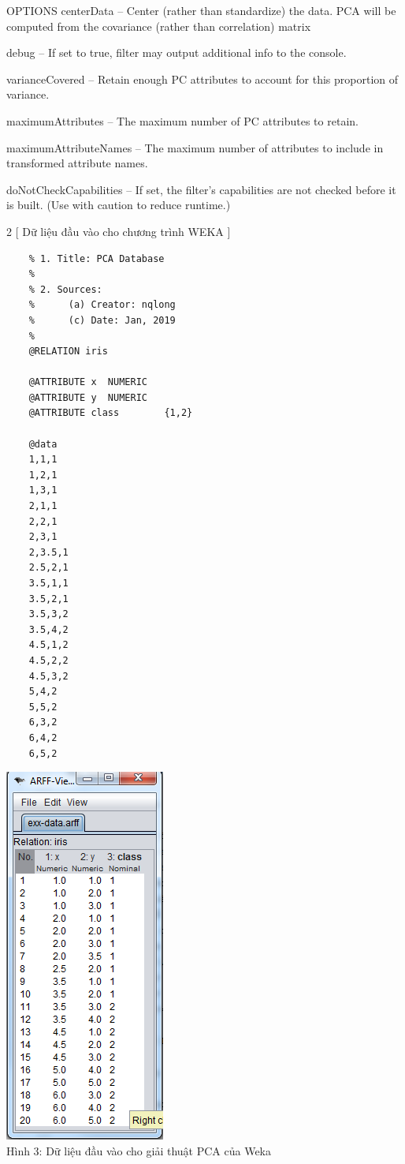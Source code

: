 \documentclass{hcmutarticle}
\begin{document}
OPTIONS
centerData -- Center (rather than standardize) the data. PCA will be computed from the covariance (rather than correlation) matrix

debug -- If set to true, filter may output additional info to the console.

varianceCovered -- Retain enough PC attributes to account for this proportion of variance.

maximumAttributes -- The maximum number of PC attributes to retain.

maximumAttributeNames -- The maximum number of attributes to include in transformed attribute names.

doNotCheckCapabilities -- If set, the filter's capabilities are not checked before it is built. (Use with caution to reduce runtime.)


\begin{multicols}{2}
	[
	Dữ liệu đầu vào cho chương trình WEKA
	]
	\begin{lstlisting}
	% 1. Title: PCA Database
	% 
	% 2. Sources:
	%      (a) Creator: nqlong
	%      (c) Date: Jan, 2019
	% 
	@RELATION iris
	
	@ATTRIBUTE x  NUMERIC
	@ATTRIBUTE y  NUMERIC
	@ATTRIBUTE class        {1,2}
	
	@data
	1,1,1
	1,2,1
	1,3,1
	2,1,1
	2,2,1
	2,3,1
	2,3.5,1
	2.5,2,1
	3.5,1,1
	3.5,2,1
	3.5,3,2
	3.5,4,2
	4.5,1,2
	4.5,2,2
	4.5,3,2
	5,4,2
	5,5,2
	6,3,2
	6,4,2
	6,5,2
	\end{lstlisting}
	
	\begin{center}
		\includegraphics[scale=0.4]{image/data_weka.png}\\[0.5cm]
		Hình 3: Dữ liệu đầu vào cho giải thuật PCA của Weka
	\end{center}
\end{multicols}
\end{document}
